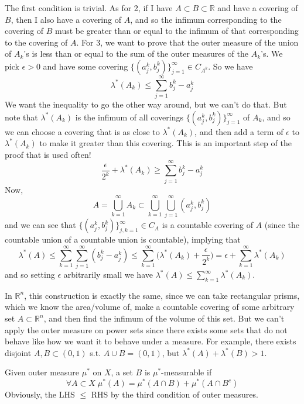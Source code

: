 \documentclass{article}
\begin{document}
\begin{proposition}
  The first condition is trivial. As for 2, if I have $A \subset B \subset \mathbb{R}$ and have a covering of $B$, then I also have a covering of $A$, and so the infimum corresponding to the covering of $B$ must be greater than or equal to the infimum of that corresponding to the covering of $A$. For 3, we want to prove that the outer measure of the union of $A_k$'s is less than or equal to the sum of the outer measures of the $A_k$'s. We pick $\epsilon > 0$ and have some covering $\{(a^k_j, b^k_j)\}_{j=1}^\infty \in C_{A^k}$. So we have 
  \[\lambda^*(A_k) \leq \sum_{j=1}^\infty b^k_j - a^k_j\]
  We want the inequality to go the other way around, but we can't do that. But note that $\lambda^* (A_k)$ is the infimum of all coverings $\{(a^k_j, b^k_j)\}_{j=1}^\infty$ of $A_k$, and so we can choose a covering that is as close to $\lambda^* (A_k)$, and then add a term of $\epsilon$ to $\lambda^*(A_k)$ to make it greater than this covering. This is an important step of the proof that is used often! 
  \[\frac{\epsilon}{2^k} + \lambda^* (A_k) \geq \sum_{j=1}^\infty b_j^k - a_j^k \]
  Now, 
  \[A = \bigcup_{k=1}^\infty A_k \subset \bigcup_{k=1}^\infty \bigcup_{j=1}^\infty (a_j^k, b_j^k)\]
  and we can see that $\{(a_j^k , b_j^k)\}_{j, k=1}^\infty \in C_A$ is a countable covering of $A$ (since the countable union of a countable union is countable), implying that 
  \[\lambda^* (A) \leq \sum_{k=1}^\infty \sum_{j=1}^\infty (b_j^k - a_j^k) \leq \sum_{k=1}^\infty \bigg( \lambda^* (A_k) + \frac{\epsilon}{2^k} \bigg) = \epsilon + \sum_{k=1}^\infty \lambda^*(A_k)\]
  and so setting $\epsilon$ arbitrarily small we have $\lambda^* (A) \leq \sum_{k=1}^\infty \lambda^* (A_k)$. 
\end{proposition}

In $\mathbb{R}^n$, this construction is exactly the same, since we can take rectangular prisms, which we know the area/volume of, make a countable covering of some arbitrary set $A \subset \mathbb{R}^n$, and then find the infimum of the volume of this set. But we can't apply the outer measure on power sets since there exists some sets that do not behave like how we want it to behave under a measure. For example, there exists disjoint $A, B \subset (0, 1)$ s.t. $A \cup B = (0, 1)$, but $\lambda^*(A) + \lambda^*(B) > 1$. 

\begin{definition}
  Given outer measure $\mu^*$ on $X$, a set $B$ is $\mu^*$-measurable if 
  \[\forall A \subset X \; \mu^*(A) = \mu^*(A \cap B) + \mu^*(A \cap B^c)\]
  Obviously, the LHS $\leq$ RHS by the third condition of outer measures. 
\end{definition}
\end{document}
